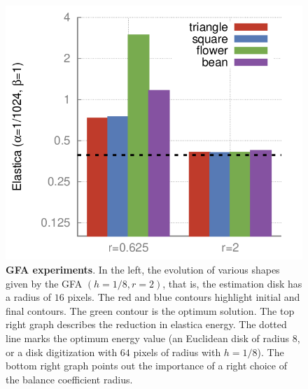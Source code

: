 \documentclass[review]{siamart220329}
\begin{document}
\begin{figure}
\begin{minipage}{0.75\textwidth}
\includegraphics[scale=0.22]{figures/shape-flow/plots/bars.png}
\end{minipage}
    \caption{\textbf{GFA experiments}. In the left, the evolution of various shapes given by the GFA $(h=1/8,r=2)$, that is, the estimation disk has a radius of $16$ pixels. The red and blue contours highlight initial and final contours. The green contour is the optimum solution. The top right graph describes the reduction in elastica energy. The dotted line marks the optimum energy value (an Euclidean disk of radius $8$, or a disk digitization with $64$ pixels of radius with $h=1/8$). The bottom right graph points out the importance of a right choice of the balance coefficient radius.}
\label{fig:graph-flow-experiments}
\end{figure}
\end{document}
